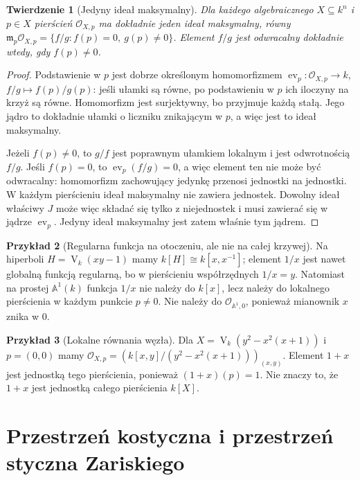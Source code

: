 \documentclass[11pt,a4paper,openany]{report}
\numberwithin{equation}{section}
\theoremstyle{plain}
\newtheorem{twierdzenie}{Twierdzenie}[section]
\theoremstyle{definition}
\newtheorem{przyklad}[twierdzenie]{Przykład}
\theoremstyle{remark}
\newcommand{\A}{\mathbb A}
\newcommand{\V}{\operatorname V}
\begin{document}
\begin{twierdzenie}[Jedyny ideał maksymalny]
\label{tw:local-unique-max}
Dla każdego algebraicznego $X\subseteq k^n$ i $p\in X$
pierścień $\mathcal O_{X,p}$ ma dokładnie jeden ideał
maksymalny, równy
$\mathfrak m_p\mathcal O_{X,p}=\{f/g:f(p)=0,\ g(p)\ne0\}$.
Element $f/g$ jest odwracalny dokładnie wtedy, gdy $f(p)\ne0$.
\end{twierdzenie}
\begin{proof}
Podstawienie w $p$ jest dobrze określonym homomorfizmem
$\operatorname{ev}_p:\mathcal O_{X,p}\to k$,
$f/g\mapsto f(p)/g(p)$: jeśli ułamki są równe,
po podstawieniu w $p$ ich iloczyny na krzyż są równe.
Homomorfizm jest surjektywny, bo przyjmuje każdą stałą.
Jego jądro to dokładnie ułamki o liczniku znikającym w $p$,
a więc jest to ideał maksymalny.

Jeżeli $f(p)\ne0$, to $g/f$ jest poprawnym ułamkiem
lokalnym i jest odwrotnością $f/g$. Jeśli $f(p)=0$,
to $\operatorname{ev}_p(f/g)=0$, a więc element ten nie
może być odwracalny: homomorfizm zachowujący jedynkę
przenosi jednostki na jednostki.
W każdym pierścieniu ideał maksymalny nie zawiera jednostek.
Dowolny ideał właściwy $J$ może więc składać się tylko
z niejednostek i musi zawierać się w jądrze
$\operatorname{ev}_p$. Jedyny ideał maksymalny jest zatem
właśnie tym jądrem.
\end{proof}

\begin{przyklad}[Regularna funkcja na otoczeniu, ale nie na całej krzywej]
Na hiperboli $H=\V_k(xy-1)$ mamy
$k[H]\cong k[x,x^{-1}]$; element $1/x$ jest nawet
globalną funkcją regularną, bo w pierścieniu współrzędnych
$1/x=y$. Natomiast na prostej $\A^1(k)$ funkcja $1/x$
nie należy do $k[x]$, lecz należy do lokalnego pierścienia
w każdym punkcie $p\ne0$. Nie należy do
$\mathcal O_{\A^1,0}$, ponieważ mianownik $x$ znika w $0$.
\end{przyklad}

\begin{przyklad}[Lokalne równania węzła]
Dla $X=\V_k(y^2-x^2(x+1))$ i $p=(0,0)$
mamy $\mathcal O_{X,p}=(k[x,y]/(y^2-x^2(x+1)))_{(x,y)}$.
Element $1+x$ jest jednostką tego pierścienia, ponieważ
$(1+x)(p)=1$. Nie znaczy to, że $1+x$ jest jednostką
całego pierścienia $k[X]$.
\end{przyklad}

\section{Przestrzeń kostyczna i przestrzeń styczna Zariskiego}
\end{document}
